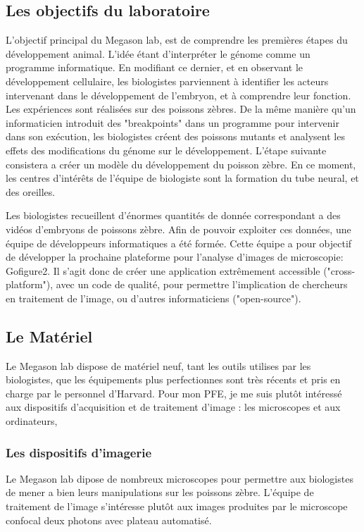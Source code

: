\subsection{Les objectifs du laboratoire}
L'objectif principal du Megason lab, est de comprendre les premières étapes du développement animal.
L'idée étant d'interpréter le génome comme un programme informatique.
En modifiant ce dernier, et en observant le développement cellulaire,
les biologistes parviennent à identifier les acteurs intervenant dans le développement de l'embryon, et à comprendre leur fonction.
Les expériences sont réalisées sur des poissons zèbres.
De la même manière qu'un informaticien introduit des "breakpoints" dans un programme pour intervenir dans son exécution,
les biologistes créent des poissons mutants et analysent les effets des modifications du génome sur le développement.
L'étape suivante consistera a créer un modèle du développement du poisson zèbre.
En ce moment, les centres d'intérêts de l'équipe de biologiste sont la formation du tube neural, et des oreilles.

Les biologistes recueillent d'énormes quantités de donnée correspondant a des vidéos d'embryons de poissons zèbre.
Afin de pouvoir exploiter ces données, une équipe de développeurs informatiques a été formée.
Cette équipe a pour objectif de développer la prochaine plateforme pour l'analyse d'images de microscopie: Gofigure2.
Il s'agit donc de créer une application extrêmement accessible ("cross-platform"), avec un code de qualité,
pour permettre l'implication de chercheurs en traitement de l'image, ou d'autres informaticiens ("open-source").

\subsection{Le Matériel} 
Le Megason lab dispose de matériel neuf, tant les outils utilises par les biologistes, que les équipements plus perfectionnes sont très récents et pris en charge par le personnel d'Harvard.
Pour mon PFE, je me suis plutôt intéressé aux dispositifs d'acquisition et de traitement d'image : les microscopes et aux ordinateurs, 

\subsubsection{Les dispositifs d'imagerie}
Le Megason lab dipose de nombreux microscopes pour permettre aux biologistes de mener a bien leurs manipulations sur les poissons zèbre.
L'équipe de traitement de l'image s'intéresse plutôt aux images produites par le microscope confocal deux photons avec plateau automatisé. 

